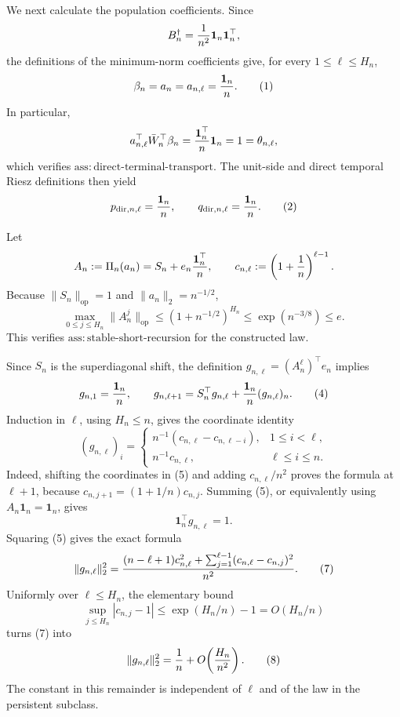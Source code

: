We next calculate the population coefficients.  Since
\[
 B_n^\dagger={1\over n^2}\boldsymbol 1_n\boldsymbol 1_n^{\top},
\]
the definitions of the minimum-norm coefficients give, for every \(1\leq\ell\leq H_n\),
\[
 \beta_n=a_n=a_{n,\ell}={\boldsymbol 1_n\over n}.
 \tag{1}
\]
In particular,
\[
 a_{n,\ell}^{\top}\bar W_n^{\top}\beta_n
 ={\boldsymbol 1_n^{\top}\over n}\boldsymbol 1_n=1
 =\theta_{n,\ell},
\]
which verifies \(\mathrm{ass{:}direct\mbox{-}terminal\mbox{-}transport}\).  The unit-side and direct temporal Riesz definitions then yield
\[
 p_{\mathrm{dir},n,\ell}={\boldsymbol 1_n\over n},
 \qquad
 q_{\mathrm{dir},n,\ell}={\boldsymbol 1_n\over n}.
 \tag{2}
\]

Let
\[
 A_n:=\Pi_n(a_n)=S_n+e_n{\boldsymbol 1_n^{\top}\over n},
 \qquad
 c_{n,\ell}:=\left(1+{1\over n}\right)^{\ell-1}.
\]
Because \(\|S_n\|_{\mathrm{op}}=1\) and \(\|a_n\|_2=n^{-1/2}\),
\[
 \max_{0\leq j\leq H_n}\|A_n^j\|_{\mathrm{op}}
 \leq \left(1+n^{-1/2}\right)^{H_n}
 \leq \exp(n^{-3/8})\leq e.
 \tag{3}
\]
This verifies \(\mathrm{ass{:}stable\mbox{-}short\mbox{-}recursion}\) for the constructed law.

Since \(S_n\) is the superdiagonal shift, the definition \(g_{n,\ell}=(A_n^\ell)^{\top}e_n\) implies
\[
 g_{n,1}={\boldsymbol 1_n\over n},
 \qquad
 g_{n,\ell+1}=S_n^{\top}g_{n,\ell}
       +{\boldsymbol 1_n\over n}(g_{n,\ell})_n.
 \tag{4}
\]
Induction in \(\ell\), using \(H_n\leq n\), gives the coordinate identity
\[
 (g_{n,\ell})_i=
 \begin{cases}
 n^{-1}(c_{n,\ell}-c_{n,\ell-i}),&1\leq i<\ell,\\
 n^{-1}c_{n,\ell},&\ell\leq i\leq n.
 \end{cases}
 \tag{5}
\]
Indeed, shifting the coordinates in (5) and adding \(c_{n,\ell}/n^2\) proves the formula at \(\ell+1\), because \(c_{n,j+1}=(1+1/n)c_{n,j}\).  Summing (5), or equivalently using \(A_n\boldsymbol 1_n=\boldsymbol 1_n\), gives
\[
 \boldsymbol 1_n^{\top}g_{n,\ell}=1.
 \tag{6}
\]
Squaring (5) gives the exact formula
\[
 \|g_{n,\ell}\|_2^2
 ={(n-\ell+1)c_{n,\ell}^2
   +\sum_{j=1}^{\ell-1}(c_{n,\ell}-c_{n,j})^2\over n^2}.
 \tag{7}
\]
Uniformly over \(\ell\leq H_n\), the elementary bound
\[
 \sup_{j\leq H_n}|c_{n,j}-1|
 \leq \exp(H_n/n)-1=O(H_n/n)
\]
turns (7) into
\[
 \|g_{n,\ell}\|_2^2={1\over n}
       +O\!\left({H_n\over n^2}\right).
 \tag{8}
\]
The constant in this remainder is independent of \(\ell\) and of the law in the persistent subclass.

